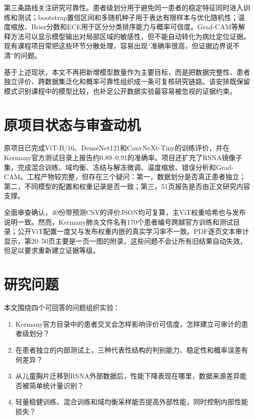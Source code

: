 第三条路线关注研究可靠性。患者级划分用于避免同一患者的稳定特征同时进入训练和测试；bootstrap置信区间和多随机种子用于表达有限样本与优化随机性；温度缩放、Brier分数和ECE用于区分分类排序能力与概率可信度。Grad-CAM等解释方法可以显示模型输出对局部区域的敏感性，但不能自动转化为病灶定位证据。现有课程项目常把这些环节分散处理，容易出现“准确率很高，但证据边界说不清”的问题。

基于上述现状，本文不再把新增模型数量作为主要目标，而是把数据完整性、患者独立评价、跨数据集泛化和概率可靠性组织成一条可复核研究链路。该安排既保留模式识别课程中的模型比较，也补足公开数据实验最容易被忽视的证据约束。

\section{原项目状态与审查动机}

原项目已完成ViT-B/16、DenseNet121和ConvNeXt-Tiny的训练评价，并在Kermany官方测试目录上报告约0.89--0.91的准确率。项目还扩充了RSNA镜像子集，完成混合训练、域均衡、冻结与解冻微调、温度缩放、错误分析和Grad-CAM。工程产物较完整，但存在三个疑问：第一，数据划分是否真正患者独立；第二，不同模型的配置和权重记录是否一致；第三，51页报告是否由正文研究内容支撑。

全面审查确认，40份带预测CSV的评价JSON均可复算，主ViT权重哈希也与发布说明一致。然而，Kermany肺炎文件名有170个患者编号跨越官方训练和测试目录；公开ViT配置一度又与发布权重内嵌的真实学习率不一致。PDF逐页文本审计显示，第20--50页主要是一页一图的附录。这些问题不会让所有旧结果自动失效，但足以要求重新建立证据等级。

\section{研究问题}

本文围绕四个可回答的问题组织实验：

\begin{enumerate}[label=RQ\arabic*：]
  \item Kermany官方目录中的患者交叉会怎样影响评价可信度，怎样建立可审计的患者级划分？
  \item 在患者独立的内部测试上，三种代表性结构的判别能力、稳定性和概率误差有何差异？
  \item 从儿童胸片迁移到RSNA外部数据后，性能下降表现在哪里，数据来源差异能否被简单统计量识别？
  \item 轻量稳健训练、混合训练和域均衡采样能否提高外部性能，同时控制内部性能损失？
\end{enumerate}

